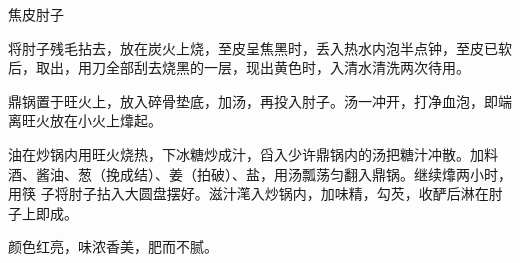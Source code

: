 %
%
%
%
%
%
%
\begin{recipe}{焦皮肘子}

\ingredients


\preparation

\step 将肘子残毛拈去，放在炭火上烧，至皮呈焦黑时，丢入热水内泡半点钟，至皮已软
后，取出，用刀全部刮去烧黑的一层，现出黄色时，入清水清洗两次待用。

\step 鼎锅置于旺火上，放入碎骨垫底，加汤，再投入肘子。汤一冲开，打净血泡，即端
离旺火放在小火上㸆起。

\step 油在炒锅内用旺火烧热，下冰糖炒成汁，舀入少许鼎锅内的汤把糖汁冲散。加料
酒、酱油、葱（挽成结）、姜（拍破）、盐，用汤瓢荡匀翻入鼎锅。继续㸆两小时，用筷
子将肘子拈入大圆盘摆好。滋汁滗入炒锅内，加味精，勾芡，收酽后淋在肘子上即成。

\features

颜色红亮，味浓香美，肥而不腻。

\end{recipe}

